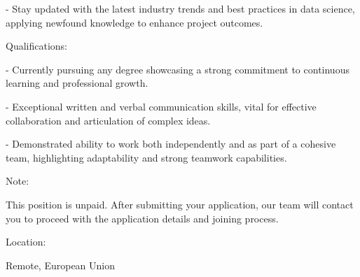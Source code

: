 - Stay updated with the latest industry trends and best practices in data science, applying newfound knowledge to enhance project outcomes.



Qualifications:



- Currently pursuing any degree showcasing a strong commitment to continuous learning and professional growth.

- Exceptional written and verbal communication skills, vital for effective collaboration and articulation of complex ideas.

- Demonstrated ability to work both independently and as part of a cohesive team, highlighting adaptability and strong teamwork capabilities.



Note:



This position is unpaid. After submitting your application, our team will contact you to proceed with the application details and joining process.



Location:

Remote, European Union